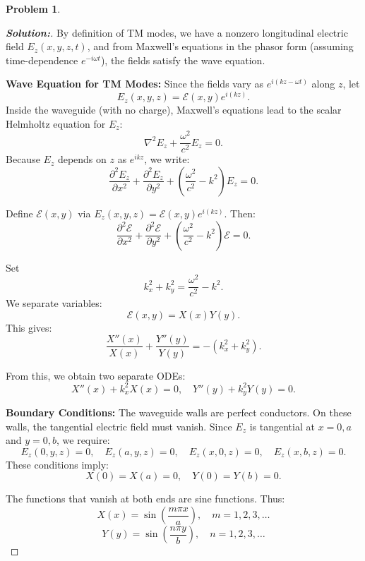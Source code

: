 \documentclass[12pt]{article}
\theoremstyle{definition}\newtheorem{problem}{Problem}
\newenvironment{solution}{\begin{proof}[\bfseries\textup{Solution:}]}{\end{proof}}
\begin{document}
\newpage
\begin{problem}
\end{problem}
\begin{solution}


    By definition of TM modes, we have a nonzero longitudinal electric field $E_{z}(x,y,z,t)$, and from Maxwell's equations in the phasor form (assuming time-dependence $e^{-i\omega t}$), the fields satisfy the wave equation.

    \noindent
    \textbf{Wave Equation for TM Modes:}  
    Since the fields vary as $e^{i(kz-\omega t)}$ along $z$, let
    \[
    E_{z}(x,y,z) = \mathcal{E}(x,y)e^{i(kz)}.
    \]
    Inside the waveguide (with no charge), Maxwell’s equations lead to the scalar Helmholtz equation for $E_z$:
    \[
    \nabla^2 E_z + \frac{\omega^2}{c^2}E_z = 0.
    \]
    Because $E_z$ depends on $z$ as $e^{i k z}$, we write:
    \[
    \frac{\partial^2 E_z}{\partial x^2} + \frac{\partial^2 E_z}{\partial y^2} + \left(\frac{\omega^2}{c^2}-k^2\right)E_z = 0.
    \]
    
    Define $\mathcal{E}(x,y)$ via $E_z(x,y,z)=\mathcal{E}(x,y)e^{i(kz)}$. Then:
    \[
    \frac{\partial^2 \mathcal{E}}{\partial x^2} + \frac{\partial^2 \mathcal{E}}{\partial y^2} + \left(\frac{\omega^2}{c^2}-k^2\right)\mathcal{E} = 0.
    \]
    
    Set 
    \[
    k_x^2 + k_y^2 = \frac{\omega^2}{c^2}-k^2.
    \]
    We separate variables:
    \[
    \mathcal{E}(x,y) = X(x)Y(y).
    \]
    This gives:
    \[
    \frac{X''(x)}{X(x)} + \frac{Y''(y)}{Y(y)} = - (k_x^2 + k_y^2).
    \]
    
    From this, we obtain two separate ODEs:
    \[
    X''(x) + k_x^2 X(x)=0, \quad Y''(y) + k_y^2 Y(y)=0.
    \]
    
    \noindent
    \textbf{Boundary Conditions:}  
    The waveguide walls are perfect conductors. On these walls, the tangential electric field must vanish. Since $E_z$ is tangential at $x=0,a$ and $y=0,b$, we require:
    \[
    E_z(0,y,z)=0, \quad E_z(a,y,z)=0, \quad E_z(x,0,z)=0, \quad E_z(x,b,z)=0.
    \]
    These conditions imply:
    \[
    X(0)=X(a)=0, \quad Y(0)=Y(b)=0.
    \]
    
    The functions that vanish at both ends are sine functions. Thus:
    \[
    X(x)=\sin\left(\frac{m \pi x}{a}\right), \quad m=1,2,3,\ldots
    \]
    \[
    Y(y)=\sin\left(\frac{n \pi y}{b}\right), \quad n=1,2,3,\ldots
    \]
    

\end{solution}
\end{document}
